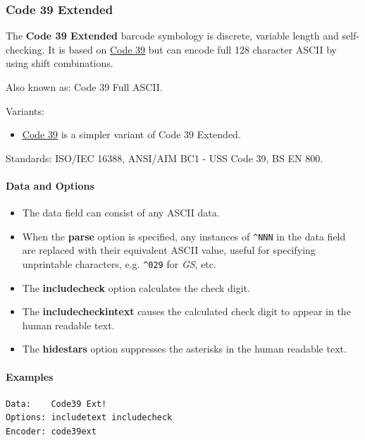 \hypertarget{code-39-extended}{%
\subsubsection{Code 39 Extended}\label{code-39-extended}}

The \textbf{Code 39 Extended} barcode symbology is discrete, variable
length and self-checking. It is based on
\protect\hyperlink{code-39}{Code 39} but can encode full 128 character
ASCII by using shift combinations.

Also known as: Code 39 Full ASCII.

Variants:

\begin{itemize}
\tightlist
\item
  \protect\hyperlink{code-39}{Code 39} is a simpler variant of Code 39
  Extended.
\end{itemize}

Standards: ISO/IEC 16388, ANSI/AIM BC1 - USS Code 39, BS EN 800.

\hypertarget{data-and-options-21}{%
\paragraph{Data and Options}\label{data-and-options-21}}

\begin{itemize}
\tightlist
\item
  The data field can consist of any ASCII data.
\item
  When the \textbf{parse} option is specified, any instances of
  \texttt{\^{}NNN} in the data field are replaced with their equivalent
  ASCII value, useful for specifying unprintable characters, e.g.
  \texttt{\^{}029} for \emph{GS}, etc.
\item
  The \textbf{includecheck} option calculates the check digit.
\item
  The \textbf{includecheckintext} causes the calculated check digit to
  appear in the human readable text.
\item
  The \textbf{hidestars} option suppresses the asterisks in the human
  readable text.
\end{itemize}

\hypertarget{examples-16}{%
\paragraph{Examples}\label{examples-16}}

\begin{verbatim}
Data:    Code39 Ext!
Options: includetext includecheck
Encoder: code39ext
\end{verbatim}

